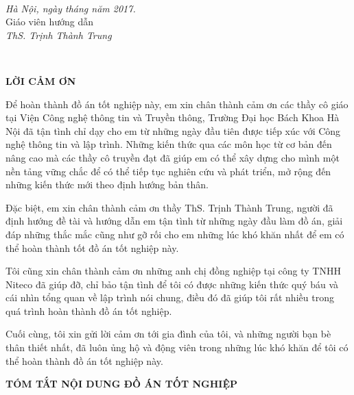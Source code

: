 \documentclass[12pt]{report}
\begin{document}
\begin{minipage}{0.3\textwidth}
\hspace{1cm}
\end{minipage}
~
\begin{minipage}{0.6\textwidth}
\centering
\textit{Hà Nội, ngày \hspace{0.3cm} tháng  \hspace{0.3cm} năm 2017.} \\
Giáo viên hướng dẫn\\[2cm]
\textit{ThS. Trịnh Thành Trung}
\end{minipage}\\[0.5cm]

\newpage

\begin{center}
{\large \textbf{LỜI CẢM ƠN}}
\end{center}
Để hoàn thành đồ án tốt nghiệp này, em xin chân thành cảm ơn các thầy cô giáo tại Viện Công nghệ thông tin và Truyền thông, Trường Đại học Bách Khoa Hà Nội đã tận tình chỉ dạy cho em từ những ngày đầu tiên được tiếp xúc với Công nghệ thông tin và lập trình. Những kiến thức qua các môn học từ cơ bản đến nâng cao mà các thầy cô truyền đạt đã giúp em có thể xây dựng cho mình một nền tảng vững chắc để có thể tiếp tục nghiên cứu và phát triển, mở rộng đến những kiến thức mới theo định hướng bản thân.

Đặc biệt, em xin chân thành cảm ơn thầy ThS. Trịnh Thành Trung, người đã định hướng đề tài và hướng dẫn em tận tình từ những ngày đầu làm đồ án, giải đáp những thắc mắc cũng như gỡ rối cho em những lúc khó khăn nhất để em có thể hoàn thành tốt đồ án tốt nghiệp này.

Tôi cũng xin chân thành cảm ơn những anh chị đồng nghiệp tại công ty TNHH Niteco đã giúp đỡ, chỉ bảo tận tình để tôi có được những kiến thức quý báu và cái nhìn tổng quan về lập trình nói chung, điều đó đã giúp tôi rất nhiều trong quá trình hoàn thành đồ án tốt nghiệp.

Cuối cùng, tôi xin gửi lời cảm ơn tới gia đình của tôi, và những người bạn bè thân thiết nhất, đã luôn ủng hộ và động viên trong những lúc khó khăn để tôi có thể hoàn thành đồ án tốt nghiệp này.

\newpage

\begin{center}
{\large \textbf{TÓM TẮT NỘI DUNG ĐỒ ÁN TỐT NGHIỆP}}
\end{center}
\end{document}
